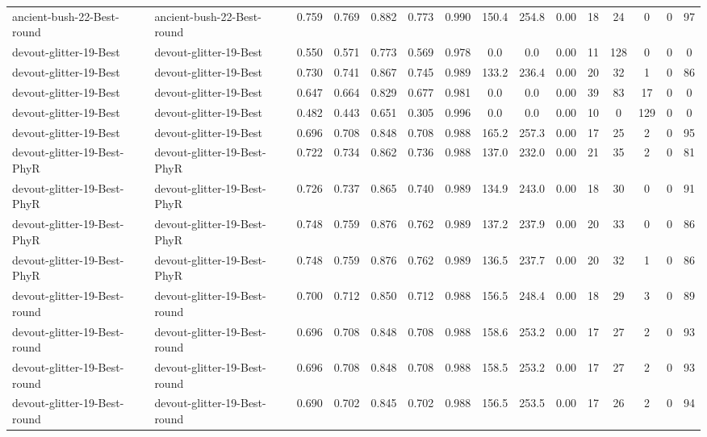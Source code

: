 \begin{table*}[p]
{\begin{tabular}{llccccccccccccc}
      ancient-bush-22-Best-round & ancient-bush-22-Best-round & 0.759 & 0.769 & 0.882 & 0.773 & 0.990 & 150.4 & 254.8 & 0.00 & 18 & 24 & 0 & 0 & 97 \\
      devout-glitter-19-Best & devout-glitter-19-Best & 0.550 & 0.571 & 0.773 & 0.569 & 0.978 & 0.0 & 0.0 & 0.00 & 11 & 128 & 0 & 0 & 0 \\
      devout-glitter-19-Best & devout-glitter-19-Best & 0.730 & 0.741 & 0.867 & 0.745 & 0.989 & 133.2 & 236.4 & 0.00 & 20 & 32 & 1 & 0 & 86 \\
      devout-glitter-19-Best & devout-glitter-19-Best & 0.647 & 0.664 & 0.829 & 0.677 & 0.981 & 0.0 & 0.0 & 0.00 & 39 & 83 & 17 & 0 & 0 \\
      devout-glitter-19-Best & devout-glitter-19-Best & 0.482 & 0.443 & 0.651 & 0.305 & 0.996 & 0.0 & 0.0 & 0.00 & 10 & 0 & 129 & 0 & 0 \\
      devout-glitter-19-Best & devout-glitter-19-Best & 0.696 & 0.708 & 0.848 & 0.708 & 0.988 & 165.2 & 257.3 & 0.00 & 17 & 25 & 2 & 0 & 95 \\
      devout-glitter-19-Best-PhyR & devout-glitter-19-Best-PhyR & 0.722 & 0.734 & 0.862 & 0.736 & 0.988 & 137.0 & 232.0 & 0.00 & 21 & 35 & 2 & 0 & 81 \\
      devout-glitter-19-Best-PhyR & devout-glitter-19-Best-PhyR & 0.726 & 0.737 & 0.865 & 0.740 & 0.989 & 134.9 & 243.0 & 0.00 & 18 & 30 & 0 & 0 & 91 \\
      devout-glitter-19-Best-PhyR & devout-glitter-19-Best-PhyR & 0.748 & 0.759 & 0.876 & 0.762 & 0.989 & 137.2 & 237.9 & 0.00 & 20 & 33 & 0 & 0 & 86 \\
      devout-glitter-19-Best-PhyR & devout-glitter-19-Best-PhyR & 0.748 & 0.759 & 0.876 & 0.762 & 0.989 & 136.5 & 237.7 & 0.00 & 20 & 32 & 1 & 0 & 86 \\
      devout-glitter-19-Best-round & devout-glitter-19-Best-round & 0.700 & 0.712 & 0.850 & 0.712 & 0.988 & 156.5 & 248.4 & 0.00 & 18 & 29 & 3 & 0 & 89 \\
      devout-glitter-19-Best-round & devout-glitter-19-Best-round & 0.696 & 0.708 & 0.848 & 0.708 & 0.988 & 158.6 & 253.2 & 0.00 & 17 & 27 & 2 & 0 & 93 \\
      devout-glitter-19-Best-round & devout-glitter-19-Best-round & 0.696 & 0.708 & 0.848 & 0.708 & 0.988 & 158.5 & 253.2 & 0.00 & 17 & 27 & 2 & 0 & 93 \\
      devout-glitter-19-Best-round & devout-glitter-19-Best-round & 0.690 & 0.702 & 0.845 & 0.702 & 0.988 & 156.5 & 253.5 & 0.00 & 17 & 26 & 2 & 0 & 94 \\

\end{tabular}}
\end{table*}
